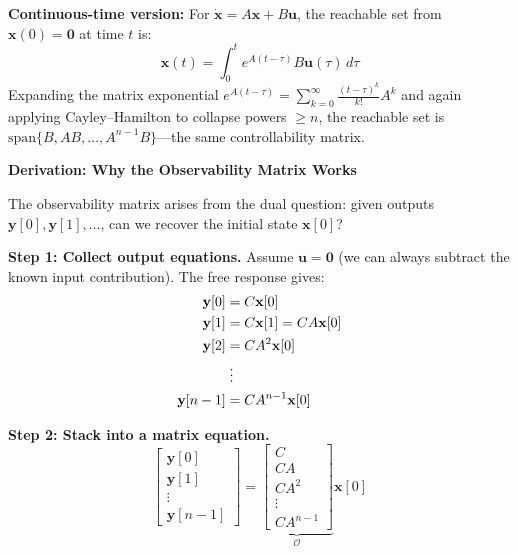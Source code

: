 \begin{mdframed}[linewidth=1pt, innertopmargin=10pt, innerbottommargin=10pt]
\textbf{Continuous-time version:} For $\dot{\mathbf{x}} = A\mathbf{x} + B\mathbf{u}$, the reachable set from $\mathbf{x}(0) = \mathbf{0}$ at time $t$ is:
\[
\mathbf{x}(t) = \int_0^{t} e^{A(t-\tau)} B \mathbf{u}(\tau) \, d\tau
\]
Expanding the matrix exponential $e^{A(t-\tau)} = \sum_{k=0}^{\infty} \frac{(t-\tau)^k}{k!} A^k$ and again applying Cayley--Hamilton to collapse powers $\geq n$, the reachable set is $\text{span}\{B, AB, \ldots, A^{n-1}B\}$---the same controllability matrix.
\end{mdframed}

\vspace{0.5em}
\begin{mdframed}[linewidth=1pt, innertopmargin=10pt, innerbottommargin=10pt]
\textbf{Derivation: Why the Observability Matrix Works}

\vspace{0.3em}
The observability matrix arises from the dual question: given outputs $\mathbf{y}[0], \mathbf{y}[1], \ldots$, can we recover the initial state $\mathbf{x}[0]$?

\textbf{Step 1: Collect output equations.} Assume $\mathbf{u} = \mathbf{0}$ (we can always subtract the known input contribution). The free response gives:
\begin{align}
\mathbf{y}[0] &= C\mathbf{x}[0] \\
\mathbf{y}[1] &= C\mathbf{x}[1] = CA\mathbf{x}[0] \\
\mathbf{y}[2] &= CA^2\mathbf{x}[0] \\
&\;\vdots \notag \\
\mathbf{y}[n-1] &= CA^{n-1}\mathbf{x}[0]
\end{align}

\textbf{Step 2: Stack into a matrix equation.}
\begin{equation}
\begin{bmatrix} \mathbf{y}[0] \\ \mathbf{y}[1] \\ \vdots \\ \mathbf{y}[n-1] \end{bmatrix}
= \underbrace{\begin{bmatrix} C \\ CA \\ CA^2 \\ \vdots \\ CA^{n-1} \end{bmatrix}}_{\mathcal{O}} \mathbf{x}[0]
\end{equation}


\end{mdframed}
